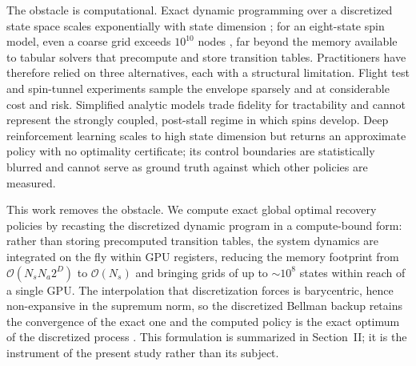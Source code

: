 \documentclass[journal ]{new-aiaa}
\begin{document}
The obstacle is computational. Exact dynamic programming over a
discretized state space scales exponentially with state dimension
\cite{Bellman1957, Bertsekas2017}; for an eight-state spin model, even a
coarse grid exceeds $10^{10}$ nodes \cite{Bunge2018}, far beyond the
memory available to tabular solvers that precompute and store transition
tables. Practitioners have therefore relied on three alternatives, each
with a structural limitation. Flight test and spin-tunnel experiments
sample the envelope sparsely and at considerable cost and risk.
Simplified analytic models trade fidelity for tractability
\cite{Crespo2012, Cunis2019} and cannot
represent the strongly coupled, post-stall regime in which spins
develop. Deep reinforcement learning scales to high state dimension
\cite{Grillo2023} but returns an approximate policy with no optimality
certificate; its control boundaries are statistically blurred and cannot
serve as ground truth against which other policies are measured.

This work removes the obstacle. We compute exact global optimal recovery
policies by recasting the discretized dynamic program in a compute-bound
form: rather than storing precomputed transition tables, the system
dynamics are integrated on the fly within GPU registers, reducing the
memory footprint from $\mathcal{O}(N_s N_a 2^D)$ to $\mathcal{O}(N_s)$
and bringing grids of up to $\sim\!10^{8}$ states within reach of a
single GPU. The interpolation that discretization forces is
barycentric, hence non-expansive in the supremum norm, so the
discretized Bellman backup retains the convergence of the exact one
and the computed policy is the exact optimum of the discretized
process \cite{Munos1998, Munos2002}. This
formulation is summarized in Section~II; it is the instrument of the
present study rather than its subject.
\end{document}
